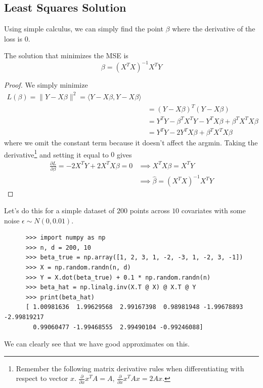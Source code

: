 \subsection{Least Squares Solution} 

  Using simple calculus, we can simply find the point $\beta$ where the derivative of the loss is $0$. 
 
  \begin{theorem}
    The solution that minimizes the MSE is 
    \begin{equation}
      \beta = (X^T X)^{-1} X^T Y 
    \end{equation}
  \end{theorem}
  \begin{proof}
    We simply minimize 
    \begin{align}
      L(\beta) = \|Y - X \beta\|^2 = \langle Y - X \beta, Y - X \beta \rangle \\ 
      & = (Y - X \beta)^T (Y - X \beta) \\ 
      & = Y^T Y - \beta^T X^T Y - Y^T X \beta + \beta^T X^T X \beta \\
      & = Y^T Y - 2 Y^T X \beta + \beta^T X^T X \beta 
    \end{align}
    where we omit the constant term because it doesn't affect the argmin. Taking the derivative\footnote{Remember the following matrix derivative rules when differentiating with respect to vector $x$. $\frac{\partial}{\partial x} x^T A = A$, $\frac{\partial}{\partial x} x^T A x = 2 Ax$. } and setting it equal to $0$ gives 
    \begin{align}
    \frac{\partial L}{\partial \beta} = - 2 X^T Y + 2 X^T X \beta = 0  
    & \implies X^T X \beta = X^T Y \\ 
    & \implies \hat{\beta} = (X^T X)^{-1} X^T Y
    \end{align}
  \end{proof} 

  \begin{example}[Simulation]
    Let's do this for a simple dataset of $200$ points across $10$ covariates with some noise $\epsilon \sim N(0, 0.01)$. 
    \begin{lstlisting}
      >>> import numpy as np 
      >>> n, d = 200, 10
      >>> beta_true = np.array([1, 2, 3, 1, -2, -3, 1, -2, 3, -1])
      >>> X = np.random.randn(n, d)
      >>> Y = X.dot(beta_true) + 0.1 * np.random.randn(n)
      >>> beta_hat = np.linalg.inv(X.T @ X) @ X.T @ Y 
      >>> print(beta_hat)
      [ 1.00981636  1.99629568  2.99167398  0.98981948 -1.99678893 -2.99819217
        0.99060477 -1.99468555  2.99490104 -0.99246088]
    \end{lstlisting} 
    We can clearly see that we have good approximates on this. 
  \end{example}

